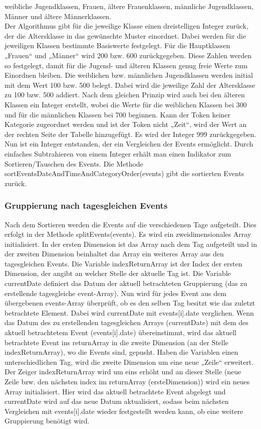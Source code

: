 weibliche Jugendklassen, Frauen, ältere Frauenklassen, männliche Jugendklassen, Männer und ältere Männerklassen. \\
Der Algorithmus gibt für die jeweilige Klasse einen dreistelligen Integer zurück, der die Altersklasse in das gewünschte Muster einordnet. Dabei werden für die jeweiligen Klassen bestimmte Basiswerte festgelegt. Für die Hauptklassen „Frauen“ und „Männer“ wird 200 bzw. 600 zurückgegeben. Diese Zahlen werden so festgelegt, damit für die Jugend- und älteren Klassen genug freie Werte zum Einordnen bleiben. Die weiblichen bzw. männlichen Jugendklassen werden initial mit dem Wert 100 bzw. 500 belegt. Dabei wird die jeweilige Zahl der Altersklasse zu 100 bzw. 500 addiert. Nach dem gleichen Prinzip wird auch bei den älteren Klassen ein Integer erstellt, wobei die Werte für die weiblichen Klassen bei 300 und für die männlichen Klassen bei 700 beginnen. Kann der Token keiner Kategorie zugeordnet werden und ist der Token nicht „Zeit“, wird der Wert an der rechten Seite der Tabelle hinzugefügt. Es wird der Integer 999 zurückgegeben.
Nun ist ein Integer entstanden, der ein Vergleichen der Events ermöglicht. Durch einfaches Subtrahieren von einem Integer erhält man einen Indikator zum Sortieren/Tauschen des Events. Die Methode sortEventsDateAndTimeAndCategoryOrder(events) gibt die sortierten Events zurück.

\subsubsection{Gruppierung nach tagesgleichen Events}
Nach dem Sortieren werden die Events auf die verschiedenen Tage aufgeteilt. Dies erfolgt in der Methode splitEvents(events). Es wird ein zweidimensionales Array initialisiert. In der ersten Dimension ist das Array nach dem Tag aufgeteilt und in der zweiten Dimension beinhaltet das Array ein weiteres Array aus den tagesgleichen Events. Die Variable indexReturnArray ist der Index der ersten Dimension, der angibt an welcher Stelle der aktuelle Tag ist. Die Variable currentDate definiert das Datum der aktuell betrachteten Gruppierung (das zu erstellende tagesgleiche event-Array). 
Nun wird für jedes Event aus dem übergebenen events-Array überprüft, ob es den selben Tag besitzt wie das zuletzt betrachtete Element. Dabei wird currentDate mit events[i].date verglichen. 
Wenn das Datum des zu erstellenden tagesgleichen Arrays (currentDate) mit dem des aktuell betrachtetem Event (events[i].date) übereinstimmt, wird das aktuell betrachtete Event ins returnArray in die zweite Dimension (an der Stelle indexReturnArray), wo die Events sind, gepusht.
Haben die Variablen einen unterschiedlichen Tag, wird die zweite Dimension um eine neue „Zeile“ erweitert. Der Zeiger indexReturnArray wird um eins erhöht und an dieser Stelle (neue Zeile bzw. den nächsten index im returnArray (ersteDimension)) wird ein neues Array initialisiert. Hier wird das aktuell betrachtete Event abgelegt und currentDate wird auf das neue Datum aktualisiert, sodass beim nächsten Vergleichen mit events[i].date wieder festgestellt werden kann, ob eine weitere Gruppierung benötigt wird.

